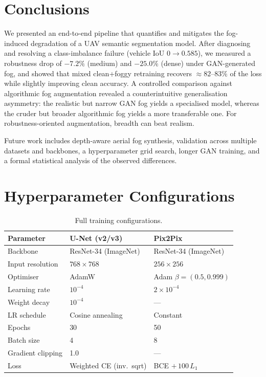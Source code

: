 \documentclass[11pt,a4paper]{article}
\begin{document}
\section{Conclusions}

We presented an end-to-end pipeline that quantifies and mitigates the
fog-induced degradation of a UAV semantic segmentation model. After
diagnosing and resolving a class-imbalance failure (vehicle IoU $0\rightarrow
0.585$), we measured a robustness drop of $-7.2\%$ (medium) and $-25.0\%$
(dense) under GAN-generated fog, and showed that mixed clean+foggy retraining
recovers $\approx 82$--$83\%$ of the loss while slightly improving clean
accuracy. A controlled comparison against algorithmic fog augmentation revealed
a counterintuitive generalisation asymmetry: the realistic but narrow GAN fog
yields a specialised model, whereas the cruder but broader algorithmic fog
yields a more transferable one. For robustness-oriented augmentation, breadth
can beat realism.

Future work includes depth-aware aerial fog synthesis, validation across
multiple datasets and backbones, a hyperparameter grid search, longer GAN
training, and a formal statistical analysis of the observed differences.

\appendix
\newpage

\section{Hyperparameter Configurations}
\begin{table}[ht]
\centering
\caption{Full training configurations.}
\begin{tabular}{lll}
\toprule
\textbf{Parameter} & \textbf{U-Net (v2/v3)} & \textbf{Pix2Pix} \\
\midrule
Backbone            & ResNet-34 (ImageNet) & ResNet-34 (ImageNet) \\
Input resolution    & $768\times768$       & $256\times256$ \\
Optimiser           & AdamW                & Adam $\beta=(0.5,0.999)$ \\
Learning rate       & $10^{-4}$            & $2\times10^{-4}$ \\
Weight decay        & $10^{-4}$            & --- \\
LR schedule         & Cosine annealing     & Constant \\
Epochs              & 30                   & 50 \\
Batch size          & 4                    & 8 \\
Gradient clipping   & 1.0                  & --- \\
Loss                & Weighted CE (inv.\ sqrt) & BCE $+\,100\,L_1$ \\
\bottomrule
\end{tabular}
\end{table}
\end{document}
